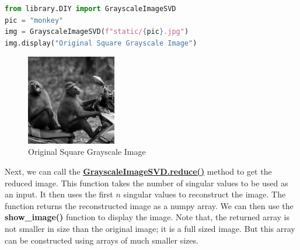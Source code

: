 	\begin{lstlisting}[language=Python]
from library.DIY import GrayscaleImageSVD
pic = "monkey"
img = GrayscaleImageSVD(f"static/{pic}.jpg")
img.display("Original Square Grayscale Image")
	\end{lstlisting}
	
	\begin{figure}[H]
		\centering
		\includegraphics[width=0.35\textwidth]{../static/monkey/monkey.jpg}
		\caption{Original Square Grayscale Image}
		\label{fig:g_monkey_orig}
	\end{figure}

	Next, we can call the \href{https://github.com/PeithonKing/comp_phys_P346/blob/main/library/DIY.py#L51-L55}{\textbf{GrayscaleImageSVD.reduce()}} method to get the reduced image. This function takes the number of singular values to be used as an input. It then uses the first $n$ singular values to reconstruct the image. The function returns the reconstructed image as a numpy array. We can then use the \textbf{show\_image()} function to display the image. Note that, the returned array is not smaller in size than the original image; it is a full sized image. But this array can be constructed using arrays of much smaller sizes.

	\begin{center}
		\noindent{}
	\end{center}
